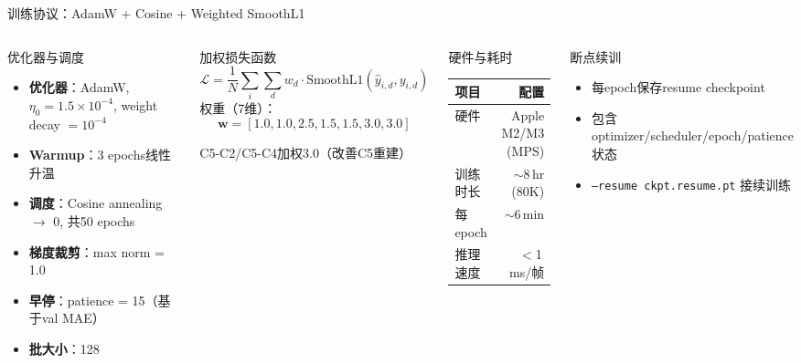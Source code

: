 \documentclass[aspectratio=169,9pt]{beamer}
\begin{document}
\begin{frame}{训练协议：AdamW + Cosine + Weighted SmoothL1}
  \begin{columns}[T]
    \begin{block}{优化器与调度}
      \scriptsize
      \begin{itemize}
        \item \textbf{优化器}：AdamW, $\eta_0 = 1.5 \times 10^{-4}$, weight decay $= 10^{-4}$
        \item \textbf{Warmup}：3 epochs线性升温
        \item \textbf{调度}：Cosine annealing $\to$ 0, 共50 epochs
        \item \textbf{梯度裁剪}：max norm = 1.0
        \item \textbf{早停}：patience = 15（基于val MAE）
        \item \textbf{批大小}：128
      \end{itemize}
    \end{block}

    \begin{block}{加权损失函数}
      \scriptsize
      \begin{equation*}
        \mathcal{L} = \frac{1}{N} \sum_i \sum_d w_d \cdot \text{SmoothL1}(\hat{y}_{i,d}, y_{i,d})
      \end{equation*}
      权重（7维）：
      \begin{equation*}
        \mathbf{w} = [1.0, 1.0, 2.5, 1.5, 1.5, 3.0, 3.0]
      \end{equation*}

      C5-C2/C5-C4加权3.0（改善C5重建）
    \end{block}

    \begin{block}{硬件与耗时}
      \scriptsize
      \begin{tabular}{@{}lr@{}}
        \toprule
        项目 & 配置 \\
        \midrule
        硬件 & Apple M2/M3 (MPS) \\
        训练时长 & $\sim$8\,hr (80K) \\
        每epoch & $\sim$6\,min \\
        推理速度 & $<$1\,ms/帧 \\
        \bottomrule
      \end{tabular}
    \end{block}

    \begin{block}{断点续训}
      \scriptsize
      \begin{itemize}
        \item 每epoch保存resume checkpoint
        \item 包含optimizer/scheduler/epoch/patience状态
        \item \texttt{--resume ckpt.resume.pt} 接续训练
      \end{itemize}
    \end{block}


\end{columns}
\end{frame}
\end{document}
